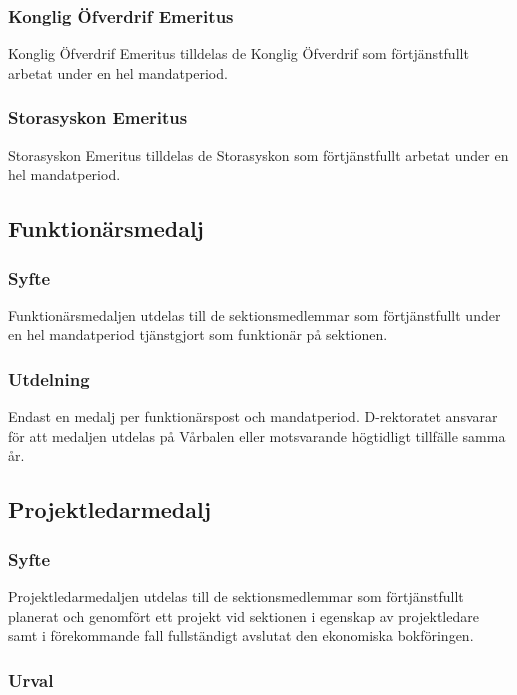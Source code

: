 \documentclass{dgovdoc}
\begin{document}
\subsubsection{Konglig Öfverdrif Emeritus}

Konglig Öfverdrif Emeritus tilldelas de Konglig Öfverdrif som förtjänstfullt
arbetat under en hel mandatperiod.

\subsubsection{Storasyskon Emeritus}

Storasyskon Emeritus tilldelas de Storasyskon som förtjänstfullt arbetat under
en hel mandatperiod.

\subsection{Funktionärsmedalj}

\subsubsection{Syfte}

Funktionärsmedaljen utdelas till de sektionsmedlemmar som förtjänstfullt under
en hel mandatperiod tjänstgjort som funktionär på sektionen.

\subsubsection{Utdelning}

Endast en medalj per funktionärspost och mandatperiod. D-rektoratet ansvarar för att medaljen utdelas på
Vårbalen eller motsvarande högtidligt tillfälle samma år.

\subsection{Projektledarmedalj}

\subsubsection{Syfte}

Projektledarmedaljen utdelas till de sektionsmedlemmar som förtjänstfullt
planerat och genomfört ett projekt vid sektionen i egenskap av projektledare
samt i förekommande fall fullständigt avslutat den ekonomiska bokföringen.

\subsubsection{Urval}
\end{document}
